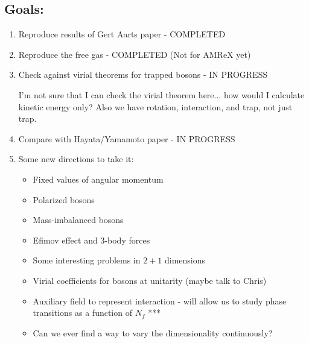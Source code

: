 \documentclass[../RotatingBosons.tex]{subfiles}
\begin{document}
\subsection{Goals:}
\begin{enumerate}
    \item Reproduce results of Gert Aarts paper - COMPLETED
    \item Reproduce the free gas - COMPLETED (Not for AMReX yet)
    \item Check against virial theorems for trapped bosons - IN PROGRESS
   
    I'm not sure that I can check the virial theorem here... how would I calculate kinetic energy only? Also we have rotation, interaction, and trap, not just trap.

    \item Compare with Hayata/Yamamoto paper - IN PROGRESS
    \item Some new directions to take it:
    \begin{itemize}
        \item Fixed values of angular momentum
        \item Polarized bosons
        \item Mass-imbalanced bosons
        \item Efimov effect and 3-body forces
        \item Some interesting problems in $2+1$ dimensions
        \item Virial coefficients for bosons at unitarity (maybe talk to Chris)
        \item Auxiliary field to represent interaction - will allow us to study phase transitions as a function of $N_{f}$ ***
        \item Can we ever find a way to vary the dimensionality continuously?
    \end{itemize}
\end{enumerate}
\end{document}
